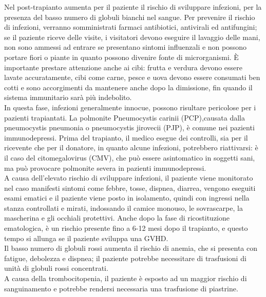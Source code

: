 Nel post-trapianto aumenta per il paziente il rischio di sviluppare infezioni, per la presenza  del basso numero 
di globuli bianchi nel sangue. Per prevenire il rischio di infezioni, verranno somministrati farmaci antibiotici, 
antivirali ed antifungini; se il paziente riceve delle visite, i visitatori devono eseguire il lavaggio delle mani, 
non sono ammessi ad entrare se presentano sintomi influenzali e non possono portare fiori o piante in quanto possono 
divenire fonte di microrganismi. È importante prestare attenzione anche ai cibi: frutta e verdura devono essere 
lavate accuratamente, cibi come carne, pesce e uova devono essere consumati ben cotti e sono accorgimenti 
da mantenere anche dopo la dimissione, fin quando il sistema immunitario  sarà più indebolito\cite{LLSBLOOD}.\\
In questa fase, infezioni generalmente innocue, possono risultare pericolose per i pazienti trapiantati. 
La polmonite Pneumocystis carinii (PCP),causata dalla pneumocystis pneumonia o pneumocystis jirovecii (PJP), è 
comune nei pazienti immunodepressi.
Prima del trapianto, il medico esegue dei controlli, sia per il ricevente che per il donatore, in quanto alcune 
infezioni, potrebbero riattivarsi: è il caso del citomegalovirus (CMV), che può essere asintomatico in soggetti sani, 
ma può provocare polmonite severa in pazienti immunodepressi\cite{STEMCELLS}.\\
A causa dell’elevato rischio di sviluppare infezioni, il paziente viene monitorato nel caso manifesti sintomi come 
febbre, tosse, dispnea, diarrea, vengono eseguiti esami ematici e il paziente viene posto in isolamento, quindi con 
ingressi nella stanza controllati e mirati, indossando il camice monouso, le sovrascarpe, la mascherina e gli 
occhiali protettivi. 
Anche dopo la fase di ricostituzione ematologica, è un rischio presente fino a 6-12 mesi dopo il trapianto, e questo 
tempo si allunga se il paziente sviluppa una GVHD\cite{STEMCELLS}.\\
Il basso numero di globuli rossi aumenta il rischio di anemia, che si presenta con fatigue, debolezza e dispnea; 
il paziente potrebbe necessitare di trasfusioni di unità di globuli rossi concentrati\cite{LLSBLOOD}.\\
A causa della trombocitopenia, il paziente è esposto ad un maggior rischio di sanguinamento e potrebbe 
rendersi necessaria una trasfusione di piastrine\cite{LLSBLOOD}.\\

